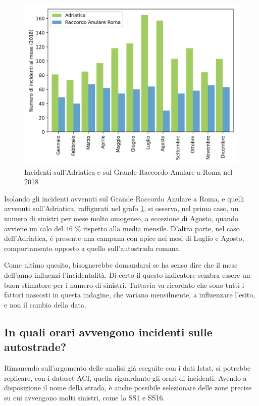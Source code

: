 \documentclass[a4paper,12pt]{report}
\begin{document}
\begin{figure}
    \hfill\includegraphics[width=0.7\linewidth]{../src/incidenti/incidenti_aci/autostrade/adriatica_roma.png}\hspace*{\fill}
    \caption{Incidenti sull'Adriatica e sul Grande Raccordo Anulare a Roma nel 2018}
    \label{fig:adriatica-roma}
\end{figure}

Isolando gli incidenti avvenuti sul Grande Raccordo Anulare a Roma, e quelli avvenuti 
sull'Adriatica, raffigurati nel grafo \ref{fig:adriatica-roma}, si osserva, 
nel primo caso, un numero di sinistri per mese molto omogeneo, a eccezione di 
Agosto, quando avviene un calo del $46$ \% rispetto alla media mensile. 
D'altra parte, nel caso dell'Adriatica, è presente una campana con apice nei 
mesi di Luglio e Agosto, comportamento opposto a quello sull'autostrada 
romana. 

Come ultimo quesito, bisognerebbe domandarsi se ha senso dire che il mese dell'anno 
influenzi l'incidentalità. 
Di certo il questo indicatore sembra essere un buon stimatore 
per i numero di sinistri. 
Tuttavia va ricordato che sono tutti i fattori 
nascosti in questa indagine, che variano mensilmente, a influenzare l'esito, e 
non il cambio della data. 

\subsection{In quali orari avvengono incidenti sulle autostrade?}

Rimanendo sull'argomento delle analisi già eseguite con i dati Istat, 
si potrebbe replicare, con i dataset ACI, quella riguardante gli orari di incidenti. 
Avendo a disposizione il nome della strada, è anche possibile selezionare delle zone precise 
su cui avvengono molti sinistri, come la SS1 e SS16. 
\end{document}
